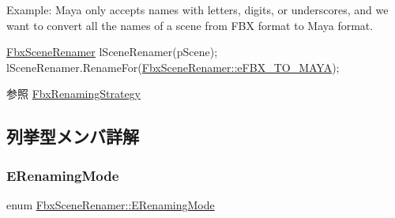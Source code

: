 Example\+: Maya only accepts names with letters, digits, or underscores, and we want to convert all the names of a scene from F\+BX format to Maya format. 
\begin{DoxyCode}
\hyperlink{class_fbx_scene_renamer}{FbxSceneRenamer} lSceneRenamer(pScene);
lSceneRenamer.RenameFor(\hyperlink{class_fbx_scene_renamer_a9279ee1a645d6499b934adbc376f8678aae982f344936a216dcab27151b49d265}{FbxSceneRenamer::eFBX\_TO\_MAYA});
\end{DoxyCode}


\begin{DoxySeeAlso}{参照}
\hyperlink{class_fbx_renaming_strategy}{Fbx\+Renaming\+Strategy} 
\end{DoxySeeAlso}


\subsection{列挙型メンバ詳解}
\mbox{\label{class_fbx_scene_renamer_a9279ee1a645d6499b934adbc376f8678}} 
\subsubsection{\texorpdfstring{E\+Renaming\+Mode}{ERenamingMode}}
{\footnotesize\ttfamily enum \hyperlink{class_fbx_scene_renamer_a9279ee1a645d6499b934adbc376f8678}{Fbx\+Scene\+Renamer\+::\+E\+Renaming\+Mode}}

